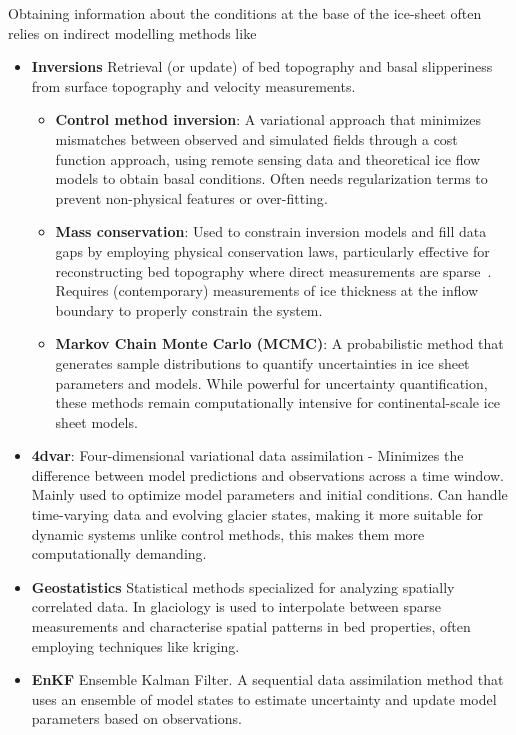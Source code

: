 Obtaining information about the conditions at the base of the ice-sheet often relies on indirect modelling methods like
\begin{itemize}

    \item\textbf{Inversions}
    Retrieval (or update) of bed topography and basal slipperiness from surface topography and velocity measurements\cite{deRydt_2013}.

        \begin{itemize}
            \item\textbf{Control method inversion}: A variational approach that minimizes mismatches between observed and simulated fields through a cost function approach, using remote sensing data and theoretical ice flow models to obtain basal conditions\cite{deRydt_2013}. Often needs regularization terms to prevent non-physical features or over-fitting\cite{Morlighem_Goldberg_2024}.

            \item\textbf{Mass conservation}: Used to constrain inversion models and fill data gaps by employing physical conservation laws, particularly effective for reconstructing bed topography where direct measurements are sparse~\cite{Morlighem_2017, Morlighem_2020}. Requires (contemporary) measurements of ice thickness at the inflow boundary to properly constrain the system\cite{Morlighem_Goldberg_2024}.

            \item\textbf{Markov Chain Monte Carlo (MCMC)}: A probabilistic method that generates sample distributions to quantify uncertainties in ice sheet parameters and models\cite{Morlighem_Goldberg_2024}. While powerful for uncertainty quantification, these methods remain computationally intensive for continental-scale ice sheet models\cite{Morlighem_Goldberg_2024}.

        \end{itemize}

    \item\textbf{4dvar}: Four-dimensional variational data assimilation - Minimizes the difference between model predictions and observations across a time window. Mainly used to optimize model parameters and initial conditions\cite{Morlighem_Goldberg_2024}. Can handle time-varying data and evolving glacier states, making it more suitable for dynamic systems unlike control methods, this makes them more computationally demanding\cite{Morlighem_Goldberg_2024}.

    \item\textbf{Geostatistics} Statistical methods specialized for analyzing spatially correlated data. In glaciology is used to interpolate between sparse measurements and characterise spatial patterns in bed properties, often employing techniques like kriging\cite{Mackie_2020}.

    \item\textbf{EnKF} Ensemble Kalman Filter. A sequential data assimilation method that uses an ensemble of model states to estimate uncertainty and update model parameters based on observations\cite{Morlighem_Goldberg_2024}.
    
\end{itemize} 
